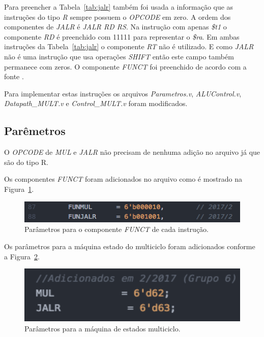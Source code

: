 \documentclass[12pt]{article}
\begin{document}
Para preencher a Tabela~\ref{tab:jalr} também foi usada a informação que as instruções do tipo \textit{R} sempre possuem o \textit{OPCODE} em zero. A ordem dos componentes de \textit{JALR} é \textit{JALR RD RS}. Na instrução com apenas \textit{\$t1} o componente \textit{RD} é preenchido com 11111 para representar o \textit{\$ra}. Em ambas instruções da Tabela~\ref{tab:jalr} o componente \textit{RT} não é utilizado. E como \textit{JALR} não é uma instrução que usa operações \textit{SHIFT} então este campo também permanece com zeros. O componente \textit{FUNCT} foi preenchido de acordo com a fonte \cite{mips32}.

Para implementar estas instruções os arquivos \textit{Parametros.v}, \textit{ALUControl.v}, \textit{Datapath\_MULT.v} e \textit{Control\_MULT.v} foram modificados. 

\subsection{Parêmetros}
\label{subsec:param}

O \textit{OPCODE} de \textit{MUL} e \textit{JALR} não precisam de nenhuma adição no arquivo já que são do tipo R.

Os componentes \textit{FUNCT} foram adicionados no arquivo como é mostrado na Figura~\ref{fig:pfunct}.

\begin{figure}[H]
	\flushleft
	\includegraphics[width=1\textwidth]{pfunct.png}
	\caption{Parâmetros para o componente \textit{FUNCT} de cada instrução.}
	\label{fig:pfunct}
\end{figure}

Os parâmetros para a máquina estado do multiciclo foram adicionados conforme a Figura~\ref{fig:pest}.

\begin{figure}[H]
	\flushleft
	\includegraphics[width=1\textwidth]{pest.png}
	\caption{Parâmetros para a máquina de estados multiciclo.}
	\label{fig:pest}
\end{figure}
\end{document}
